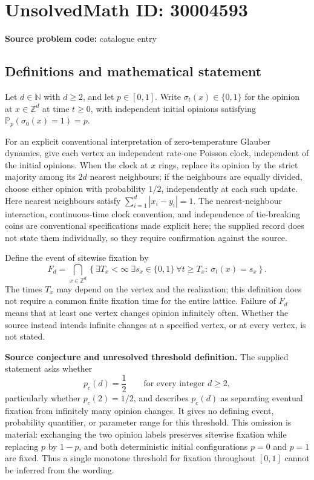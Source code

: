 \documentclass[11pt]{article}
\newcommand{\N}{\mathbb{N}}
\newcommand{\Z}{\mathbb{Z}}
\begin{document}
\section*{UnsolvedMath ID: 30004593}
\textbf{Source problem code:} catalogue entry
\subsection{Definitions and mathematical statement}
Let \(d\in\N\) with \(d\geq2\), and let \(p\in[0,1]\). Write \(\sigma_t(x)\in\{0,1\}\) for the opinion at \(x\in\Z^d\) at time \(t\geq0\), with independent initial opinions satisfying \(\mathbb P_p(\sigma_0(x)=1)=p\).

For an explicit conventional interpretation of zero-temperature Glauber dynamics, give each vertex an independent rate-one Poisson clock, independent of the initial opinions. When the clock at \(x\) rings, replace its opinion by the strict majority among its \(2d\) nearest neighbours; if the neighbours are equally divided, choose either opinion with probability \(1/2\), independently at each such update. Here nearest neighbours satisfy \(\sum_{i=1}^d|x_i-y_i|=1\). The nearest-neighbour interaction, continuous-time clock convention, and independence of tie-breaking coins are conventional specifications made explicit here; the supplied record does not state them individually, so they require confirmation against the source.

Define the event of sitewise fixation by
\[
 F_d=\bigcap_{x\in\Z^d}\left\{\exists T_x<\infty\ \exists s_x\in\{0,1\}\ \forall t\geq T_x:\ \sigma_t(x)=s_x\right\}.
\]
The times \(T_x\) may depend on the vertex and the realization; this definition does not require a common finite fixation time for the entire lattice. Failure of \(F_d\) means that at least one vertex changes opinion infinitely often. Whether the source instead intends infinite changes at a specified vertex, or at every vertex, is not stated.

\textbf{Source conjecture and unresolved threshold definition.} The supplied statement asks whether
\[
 p_c(d)=\frac12\qquad\text{for every integer }d\geq2,
\]
particularly whether \(p_c(2)=1/2\), and describes \(p_c(d)\) as separating eventual fixation from infinitely many opinion changes. It gives no defining event, probability quantifier, or parameter range for this threshold. This omission is material: exchanging the two opinion labels preserves sitewise fixation while replacing \(p\) by \(1-p\), and both deterministic initial configurations \(p=0\) and \(p=1\) are fixed. Thus a single monotone threshold for fixation throughout \([0,1]\) cannot be inferred from the wording.
\end{document}
